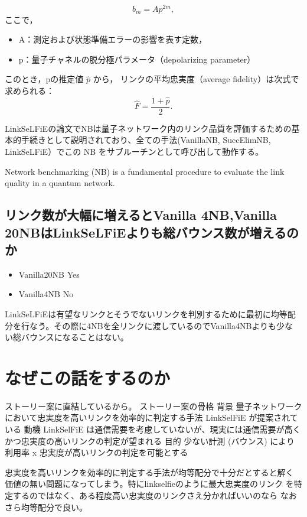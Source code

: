 \documentclass[conference]{IEEEtran}
\begin{document}
\[
b_m = A p^{2m},
\]
ここで，

\begin{itemize}
\item A：測定および状態準備エラーの影響を表す定数，
\item p：量子チャネルの脱分極パラメータ（depolarizing parameter）
\end{itemize}


このとき，pの推定値 \(\hat{p}\) から，
リンクの平均忠実度（average fidelity）は次式で求められる：
\[
\hat{F} = \frac{1 + \hat{p}}{2}.
\]

LinkSeLFiEの論文でNBは量子ネットワーク内のリンク品質を評価するための基
本的手続きとして説明されており、全ての手法(VanillaNB, SuccElimNB,
LinkSeLFiE）でこの NB をサブルーチンとして呼び出して動作する。

Network benchmarking (NB) is a fundamental procedure to evaluate the link quality in a quantum network.


\subsection{リンク数が大幅に増えるとVanilla 4NB,Vanilla 20NBはLinkSeLFiEよりも総バウンス数が増えるのか}
\label{sec:org0949175}
\begin{itemize}
\item Vanilla20NB Yes
\item Vanilla4NB No
\end{itemize}

LinkSeLFiEは有望なリンクとそうでないリンクを判別するために最初に均等配
分を行なう。その際に4NBを全リンクに渡しているのでVanilla4NBよりも少な
い総バウンスになることはない。

\section{なぜこの話をするのか}
\label{sec:org9b5b26d}
ストーリー案に直結しているから。
ストーリー案の骨格
背景 量子ネットワークにおいて忠実度を高いリンクを効率的に判定する手法 LinkSelFiE が提案されている
動機 LinkSelFiE は通信需要を考慮していないが、現実には通信需要が高くかつ忠実度の高いリンクの判定が望まれる
目的 少ない計測 (バウンス) により利用率 x 忠実度が高いリンクの判定を可能とする

忠実度を高いリンクを効率的に判定する手法が均等配分で十分だとすると解く
価値の無い問題になってしまう。特にlinkselfieのように最大忠実度のリンク
を特定するのではなく、ある程度高い忠実度のリンクさえ分かればいいのなら
なおさら均等配分で良い。
\end{document}
